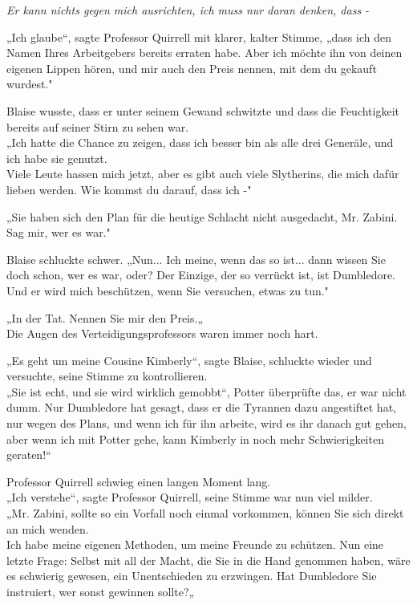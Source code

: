 {\emph{Er kann nichts gegen mich ausrichten, ich muss nur daran denken, dass -}

„Ich glaube“, sagte Professor Quirrell mit klarer, kalter Stimme, „dass ich den Namen Ihres Arbeitgebers bereits erraten habe. Aber ich möchte ihn von deinen eigenen Lippen hören, und mir auch den Preis nennen, mit dem du gekauft wurdest."

Blaise wusste, dass er unter seinem Gewand schwitzte und dass die Feuchtigkeit bereits auf seiner Stirn zu sehen war.\\ „Ich hatte die Chance zu zeigen, dass ich besser bin als alle drei Generäle, und ich habe sie genutzt.\\ Viele Leute hassen mich jetzt, aber es gibt auch viele Slytherins, die mich dafür lieben werden. Wie kommst du darauf, dass ich -"

„Sie haben sich den Plan für die heutige Schlacht nicht ausgedacht, Mr. Zabini. Sag mir, wer es war."

Blaise schluckte schwer. „Nun... Ich meine, wenn das so ist... dann wissen Sie doch schon, wer es war, oder? Der Einzige, der so verrückt ist, ist Dumbledore. Und er wird mich beschützen, wenn Sie versuchen, etwas zu tun."

„In der Tat. Nennen Sie mir den Preis.„\\ Die Augen des Verteidigungsprofessors waren immer noch hart.

„Es geht um meine Cousine Kimberly“, sagte Blaise, schluckte wieder und versuchte, seine Stimme zu kontrollieren.\\ „Sie ist echt, und sie wird wirklich gemobbt“, Potter überprüfte das, er war nicht dumm. Nur Dumbledore hat gesagt, dass er die Tyrannen dazu angestiftet hat, nur wegen des Plans, und wenn ich für ihn arbeite, wird es ihr danach gut gehen, aber wenn ich mit Potter gehe, kann Kimberly in noch mehr Schwierigkeiten geraten!“

Professor Quirrell schwieg einen langen Moment lang.\\ „Ich verstehe“, sagte Professor Quirrell, seine Stimme war nun viel milder.\\ „Mr. Zabini, sollte so ein Vorfall noch einmal vorkommen, können Sie sich direkt an mich wenden.\\ Ich habe meine eigenen Methoden, um meine Freunde zu schützen. Nun eine letzte Frage: Selbst mit all der Macht, die Sie in die Hand genommen haben, wäre es schwierig gewesen, ein Unentschieden zu erzwingen. Hat Dumbledore Sie instruiert, wer sonst gewinnen sollte?„

}
